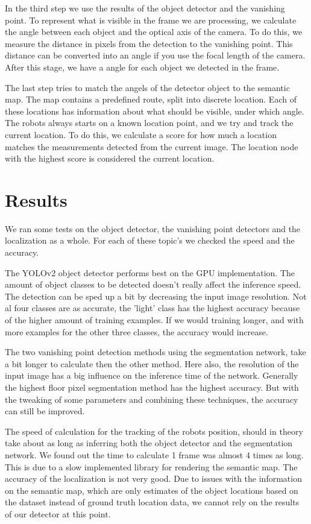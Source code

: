 In the third step we use the results of the object detector and the vanishing point.
To represent what is visible in the frame we are processing, we calculate the angle between each object and the optical axis of the camera.
To do this, we measure the distance in pixels from the detection to the vanishing point.
This distance can be converted into an angle if you use the focal length of the camera.
After this stage, we have a angle for each object we detected in the frame.

The last step tries to match the angels of the detector object to the semantic map.
The map contains a predefined route, split into discrete location.
Each of these locations has information about what should be visible, under which angle.
The robots always starts on a known location point, and we try and track the current location.
To do this, we calculate a score for how much a location matches the measurements detected from the current image.
The location node with the highest score is considered the current location.

\section*{Results}
We ran some tests on the object detector, the vanishing point detectors and the localization as a whole.
For each of these topic's we checked the speed and the accuracy.

The YOLOv2 object detector performs best on the GPU implementation.
The amount of object classes to be detected doesn't really affect the inference speed.
The detection can be sped up a bit by decreasing the input image resolution.
Not al four classes are as accurate, the 'light' class has the highest accuracy because of the higher amount of training examples.
If we would training longer, and with more examples for the other three classes, the accuracy would increase.

The two vanishing point detection methods using the segmentation network, take a bit longer to calculate then the other method.
Here also, the resolution of the input image has a big influence on the inference time of the network.
Generally the highest floor pixel segmentation method has the highest accuracy.
But with the tweaking of some parameters and combining these techniques, the accuracy can still be improved.

The speed of calculation for the tracking of the robots position, should in theory take about as long as inferring both the
object detector and the segmentation network.
We found out the time to calculate 1 frame was almost 4 times as long.
This is due to a slow implemented library for rendering the semantic map.
The accuracy of the localization is not very good.
Due to issues with the information on the semantic map, which are only estimates of the object locations based on the dataset instead of
ground truth location data, we cannot rely on the results of our detector at this point.

